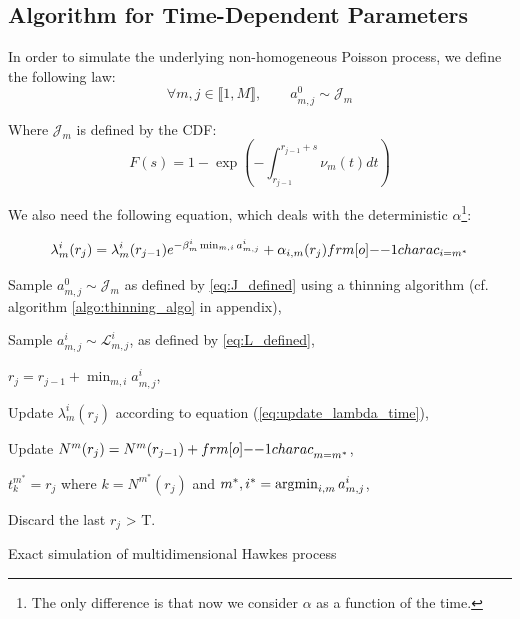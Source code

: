 \subsection{Algorithm for Time-Dependent Parameters}

In order to simulate the underlying non-homogeneous Poisson process, we define the following law:
$$ \forall m,j \in  \llbracket 1, M \rrbracket, \qquad a_{m,j}^0 \sim \mathcal J_m  $$

Where $\mathcal J_m $ is defined by the CDF:
\begin{equation}
\label{eq:J_defined}
F(s) = 1 - \exp \left ( - \int_{r_{j-1}}^{r_{j-1} + s } \nu_m (t) dt \right )
\end{equation}

We also need the following equation, which deals with the deterministic $\alpha$\footnote{The only difference is that now we consider $\alpha$ as a function of the time.}:

\begin{equation}
\lambda_m^i ( r_j ) = \lambda_m^i ( r_{j-1} )  e^{ - \beta_m^i \min_{m,i} a_{m,j}^i } + \alpha_{i,m} (r_j) \11charac_{i = m^*}
\label{eq:update_lambda_time} 
\end{equation}




\begin{algorithm}[H]
\label{algo:simul_hp_time}
\SetAlgoLined

			{ 
					{
						{Sample $a_{m,j}^0 \sim \mathcal J_{m} $ as defined by \ref{eq:J_defined} using a thinning algorithm (cf. algorithm \ref{algo:thinning_algo} in appendix),
						
							{Sample $a_{m,j}^i \sim  \mathcal L^i_{m,j} $, as defined by \ref{eq:L_defined},
							}
						}
						
						$r_j = r_{j-1} + \min_{m,i} a_{m,j}^i$,
						
							{Update $\lambda_m^i ( r_j )$ according to equation (\ref{eq:update_lambda_time}),
							
							Update $N^m ( r_j ) = N^m( r_{j-1} ) + {\11charac}_{m = m^*} $,}
					$t_k^{m^*} = r_j$ where $k = N^{m^*} ( r_j ) $ and $ m^*,i^* = \operatorname*{\arg\!\min}_{i,m} a_{m,j}^i $,
					}
			Discard the last $r_j$ > T.
			}
\caption{Exact simulation of multidimensional Hawkes process}
\end{algorithm}


